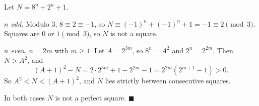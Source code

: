 Let $N=8^n+2^n+1$.

\emph{$n$ odd.} Modulo $3$, $8\equiv2\equiv-1$, so $N\equiv(-1)^n+(-1)^n+1=-1\equiv2\pmod3$. Squares are $0$ or $1\pmod 3$, so $N$ is not a square.

\emph{$n$ even,} $n=2m$ with $m\ge1$. Let $A=2^{3m}$, so $8^n=A^2$ and $2^n=2^{2m}$. Then $N>A^2$, and
\[(A+1)^2-N=2\cdot2^{3m}+1-2^{2m}-1=2^{2m}(2^{m+1}-1)>0.\]
So $A^2<N<(A+1)^2$, and $N$ lies strictly between consecutive squares.

In both cases $N$ is not a perfect square. $\blacksquare$
